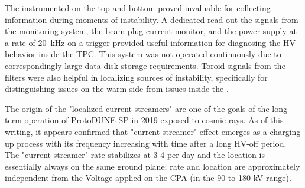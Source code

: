 
The instrumented  on the top and bottom  proved invaluable for collecting information during moments of instability.
A dedicated  read out the signals from the  monitoring system, the beam plug current monitor, and the power supply at a rate of \SI{20}{kHz} on a trigger provided useful information for diagnosing the HV behavior inside the TPC.
This system was not operated continuously due to correspondingly large data disk storage requirements.
Toroid signals from the  filters were also helpful in localizing sources of instability, specifically for distinguishing issues on the warm side from issues inside the .

The origin of the "localized current streamers" are one of the goals of the long term operation of ProtoDUNE SP in 2019 exposed to cosmic rays.
As of this writing, it appears confirmed that "current streamer" effect emerges as a charging up process with its frequency increasing with time after a long HV-off period. The "current streamer" rate stabilizes at 3-4 per day and the location is essentially always on the same ground plane; rate and location are approximately independent from the Voltage applied on the CPA (in the 90 to 180 kV range).

